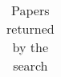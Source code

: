 \begin{table}[H]
\centering
\caption{Papers returned by the search}
\label{Tabela I}
\begin{tabular}{|l|c|c|c|}
\hline


\end{tabular}
\end{table}
